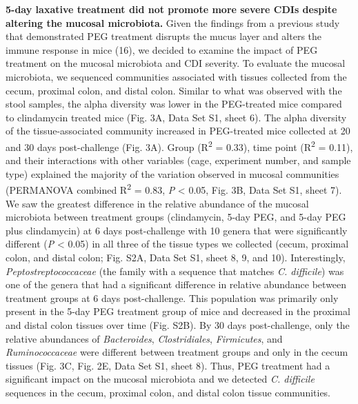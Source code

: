\documentclass[
  11pt,
]{article}
\begin{document}
\textbf{5-day laxative treatment did not promote more severe CDIs
despite altering the mucosal microbiota.} Given the findings from a
previous study that demonstrated PEG treatment disrupts the mucus layer
and alters the immune response in mice (16), we decided to examine the
impact of PEG treatment on the mucosal microbiota and CDI severity. To
evaluate the mucosal microbiota, we sequenced communities associated
with tissues collected from the cecum, proximal colon, and distal colon.
Similar to what was observed with the stool samples, the alpha diversity
was lower in the PEG-treated mice compared to clindamycin treated mice
(Fig. 3A, Data Set S1, sheet 6). The alpha diversity of the
tissue-associated community increased in PEG-treated mice collected at
20 and 30 days post-challenge (Fig. 3A). Group (R\textsuperscript{2} =
0.33), time point (R\textsuperscript{2} = 0.11), and their interactions
with other variables (cage, experiment number, and sample type)
explained the majority of the variation observed in mucosal communities
(PERMANOVA combined R\textsuperscript{2} = 0.83, \emph{P} \textless{}
0.05, Fig. 3B, Data Set S1, sheet 7). We saw the greatest difference in
the relative abundance of the mucosal microbiota between treatment
groups (clindamycin, 5-day PEG, and 5-day PEG plus clindamycin) at 6
days post-challenge with 10 genera that were significantly different
(\emph{P} \textless{} 0.05) in all three of the tissue types we
collected (cecum, proximal colon, and distal colon; Fig. S2A, Data Set
S1, sheet 8, 9, and 10). Interestingly, \emph{Peptostreptococcaceae}
(the family with a sequence that matches \emph{C. difficile}) was one of
the genera that had a significant difference in relative abundance
between treatment groups at 6 days post-challenge. This population was
primarily only present in the 5-day PEG treatment group of mice and
decreased in the proximal and distal colon tissues over time (Fig. S2B).
By 30 days post-challenge, only the relative abundances of
\emph{Bacteroides}, \emph{Clostridiales}, \emph{Firmicutes}, and
\emph{Ruminococcaceae} were different between treatment groups and only
in the cecum tissues (Fig. 3C, Fig. 2E, Data Set S1, sheet 8). Thus, PEG
treatment had a significant impact on the mucosal microbiota and we
detected \emph{C. difficile} sequences in the cecum, proximal colon, and
distal colon tissue communities.
\end{document}
